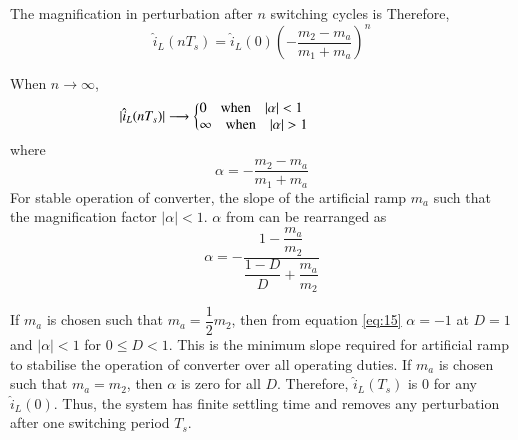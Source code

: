 	The magnification in perturbation after $n$ switching cycles is
	Therefore,
	\begin{equation}
		\hat{i}_L(nT_s) = \hat{i}_L(0)\left(-\dfrac{m_2-m_a}{m_1+m_a} \right)^n
		\label{eq:13}
	\end{equation}

	When $n\longrightarrow \infty$,
	\begin{align}
		|\hat{i}_L(nT_s)| \longrightarrow \left\{ 
		\parbox[]{2in}
		{$0 \quad \text{when} \quad |\alpha| < 1 $\\
		$\infty \quad \text{when} \quad |\alpha| > 1$}
		\right.
		\label{eq:14}
	\end{align}
	where $$ \alpha = -\dfrac{m_2-m_a}{m_1+m_a} $$
	For stable operation of converter, the slope of the artificial ramp $m_a$ such that the magnification factor $|\alpha| < 1$. $\alpha$ from can be rearranged as
	\begin{equation}
		\alpha = -\dfrac{1-\dfrac{m_a}{m_2}}{\dfrac{1-D}{D}+\dfrac{m_a}{m_2}}
		\label{eq:15}
	\end{equation}

	If $m_a$ is chosen such that $m_a = \dfrac{1}{2}m_2$, then from equation \eqref{eq:15} $\alpha = -1$ at $D = 1$ and $|\alpha|<1$ for $0 \leq D < 1$. This is the minimum slope required for artificial ramp to stabilise the operation of converter over all operating duties. If $m_a$ is chosen such that $m_a = m_2$, then $\alpha$ is zero for all $D$. Therefore, $\hat{i}_L(T_s)$ is $0$ for any $\hat{i}_L(0)$. Thus, the system has finite settling time and removes any perturbation after one switching period $T_s$.